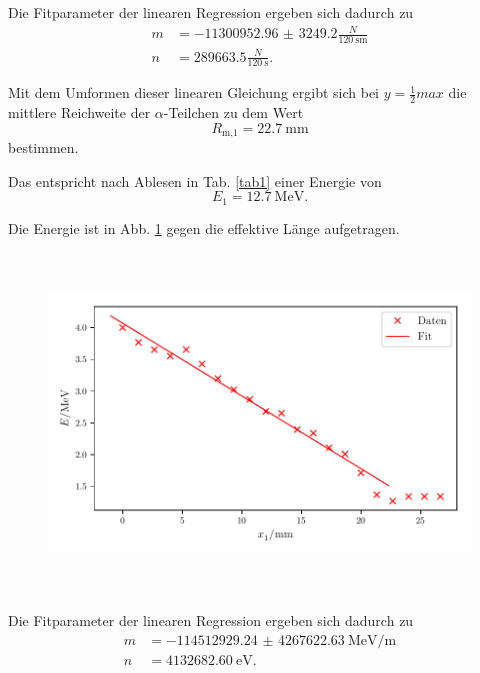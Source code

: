 \noindent Die Fitparameter der linearen Regression ergeben sich dadurch zu 
\begin{align*}
    m &= \num{-11300952.96(324920)} \frac{N}{\SI{120}{\second} \si{\meter}} \\
    n &= \num{289663.5} \frac{N}{\SI{120}{\second}} .
\end{align*}


\noindent Mit dem Umformen dieser linearen Gleichung ergibt sich bei $y = \frac{1}{2} max$ die mittlere Reichweite der $\alpha$-Teilchen zu dem Wert %
\begin{equation*}
    R_\text{m,1} = \SI{22.7}{\milli\meter}
\end{equation*}
bestimmen.

\noindent Das entspricht  nach Ablesen in Tab. \ref{tab1} einer Energie von %
\begin{equation*}
    E_1 = \SI{12.7}{\mega\electronvolt}.
\end{equation*}

Die Energie ist in Abb. \ref{fig:energie1} gegen die effektive Länge aufgetragen.
\begin{figure}
    \centering
    \includegraphics[width=12cm, height=9cm]{build/plotb.pdf}
    \caption{}
    \label{fig:energie1}
\end{figure}

\noindent Die Fitparameter der linearen Regression ergeben sich dadurch zu 
\begin{align*}
    m &= \SI{-114512929.24(426762263)}{\mega\electronvolt\per\meter} \\
    n &= \SI{4132682.60}{\electronvolt} .
\end{align*}

